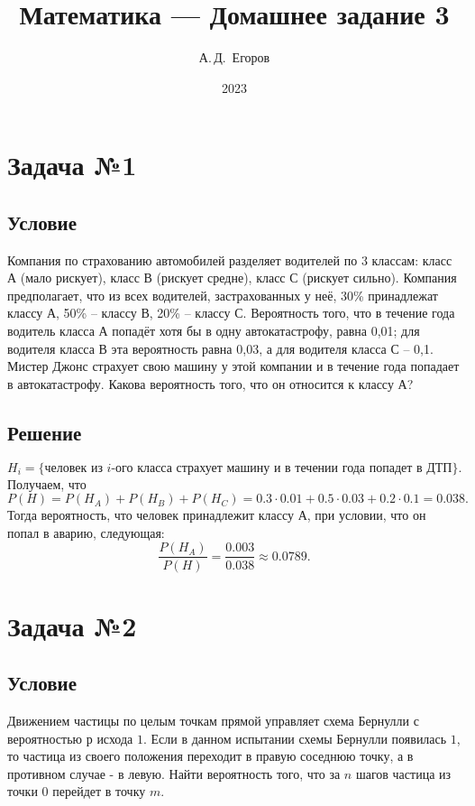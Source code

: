 \documentclass[12pt, a4paper]{article}
\title{Математика --- Домашнее задание 3}
\author{А.\,Д.~Егоров}
\date{2023}
\begin{document}
	
	\maketitle
	\tableofcontents
	\pagebreak
	
	\section{Задача №1}
	
		\subsection*{Условие}		
			Компания по страхованию автомобилей разделяет водителей по 3 классам: класс А (мало
			рискует), класс В (рискует средне), класс С (рискует сильно). Компания предполагает, что
			из всех водителей, застрахованных у неё, 30\% принадлежат классу А, 50\% – классу В, 20\% –
			классу С. Вероятность того, что в течение года водитель класса А попадёт хотя бы в одну
			автокатастрофу, равна 0,01; для водителя класса В эта вероятность равна 0,03, а для
			водителя класса С – 0,1. Мистер Джонс страхует свою машину у этой компании и в течение
			года попадает в автокатастрофу. Какова вероятность того, что он относится к классу А?
		
			
		\subsection*{Решение}
		
			$
				H_i = \{\text{человек из } i\text{-ого класса страхует машину и в течении года попадет в ДТП}\}.
			$ 
			Получаем, что 
			$
				P(H) = P(H_A) + P(H_B)  + P(H_C) = 0.3 \cdot 0.01 + 0.5 \cdot 0.03 + 0.2 \cdot 0.1 = 0.038.
			$
			Тогда вероятность, что человек принадлежит классу А, при условии, что он попал в аварию, следующая:
			$$
				\dfrac{P(H_A)}{P(H)} = \dfrac{0.003}{0.038} \approx 0.0789.
			$$
			
	\newpage
	\section{Задача №2}
	
		\subsection*{Условие}		
			Движением частицы по целым точкам прямой управляет схема Бернулли с вероятностью
			$р$ исхода $1$. Если в данном испытании схемы Бернулли появилась $1$, то частица из своего
			положения переходит в правую соседнюю точку, а в противном случае - в левую.
			Найти	
			вероятность того, что за $n$ шагов частица из точки $0$ перейдет в точку $m$.
		
\end{document}
